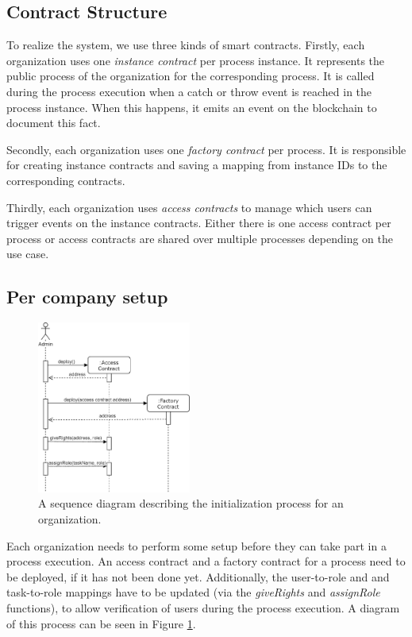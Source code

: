 \documentclass[runningheads]{llncs}
\begin{document}
\subsection{Contract Structure}
To realize the system, we use three kinds of smart contracts.
Firstly, each organization uses one \emph{instance contract} per process instance.
It represents the public process of the organization for the corresponding process.
It is called during the process execution when a catch or throw event is reached in the process instance.
When this happens, it emits an event on the blockchain to document this fact.

Secondly, each organization uses one \emph{factory contract} per process.
It is responsible for creating instance contracts and saving a mapping from instance IDs to the corresponding contracts.

Thirdly, each organization uses \emph{access contracts} to manage which users can trigger events on the instance contracts.
Either there is one access contract per process or access contracts are shared over multiple processes depending on the use case.

\subsection{Per company setup}
\begin{figure}
	\centering
	\includegraphics[width=0.45\textwidth]{fig/initialization.eps}
	\caption{A sequence diagram describing the initialization process for an organization.}
	\label{fig:initialization}
\end{figure}

Each organization needs to perform some setup before they can take part in a process execution.
An access contract and a factory contract for a process need to be deployed, if it has not been done yet.
Additionally, the user-to-role and and task-to-role mappings have to be updated (via the \emph{giveRights} and \emph{assignRole} functions), to allow verification of users during the process execution.
A diagram of this process can be seen in Figure \ref{fig:initialization}.
\end{document}

